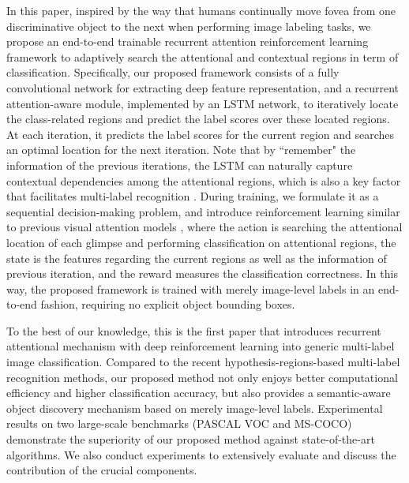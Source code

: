 \documentclass[letterpaper]{article} %
\begin{document}
In this paper, inspired by the way that humans continually move fovea from one discriminative object to the next when performing image labeling tasks, we propose an end-to-end trainable recurrent attention reinforcement learning framework to adaptively search the attentional and contextual regions in term of classification. Specifically, our proposed framework consists of a fully convolutional network for extracting deep feature representation, and a recurrent attention-aware module, implemented by an LSTM network, to iteratively locate the class-related regions and predict the label scores over these located regions. At each iteration, it predicts the label scores for the current region and searches an optimal location for the next iteration. Note that by ``remember" the information of the previous iterations, the LSTM can naturally capture contextual dependencies among the attentional regions, which is also a key factor that facilitates multi-label recognition \cite{zhang2016multi}. During training, we formulate it as a sequential decision-making problem, and introduce reinforcement learning similar to previous visual attention models \cite{mnih2014recurrent,ba2014multiple}, where the action is searching the attentional location of each glimpse and performing classification on attentional regions, the state is the features regarding the current regions as well as the information of previous iteration, and the reward measures the classification correctness. In this way, the proposed framework is trained with merely image-level labels in an end-to-end fashion, requiring no explicit object bounding boxes.

To the best of our knowledge, this is the first paper that introduces recurrent attentional mechanism with deep reinforcement learning into generic multi-label image classification. Compared to the recent hypothesis-regions-based multi-label recognition methods, our proposed method not only enjoys better computational efficiency and higher classification accuracy, but also provides a semantic-aware object discovery mechanism based on merely image-level labels. Experimental results on two large-scale benchmarks (PASCAL VOC and MS-COCO) demonstrate the superiority of our proposed method against state-of-the-art algorithms. We also conduct experiments to extensively evaluate and discuss the contribution of the crucial components. 
\end{document}
